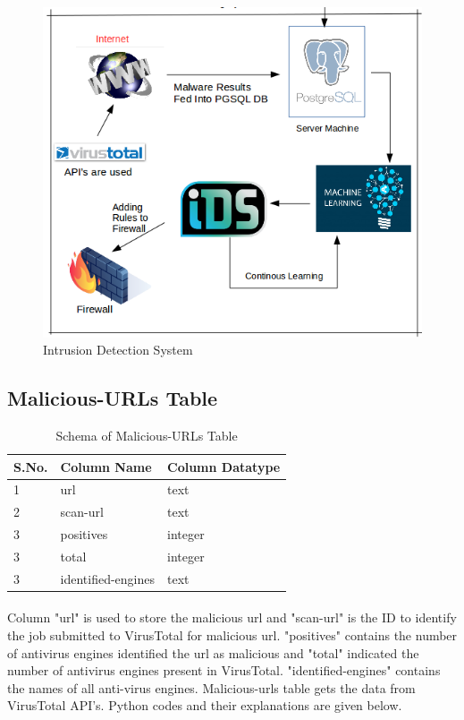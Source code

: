 \documentclass{report}
\begin{document}
\begin{figure}[H]
\centering
\caption{Intrusion Detection System}
\includegraphics[scale=0.7]{Intrusion_Detection_System}
\end{figure}

\subsection{Malicious-URLs Table}

\begin{table}[H]
\begin{tabular}{ |p{2cm}|p{5cm}|p{5cm}|  }
 \hline
 \textbf{S.No.} & \textbf{Column Name} & \textbf{Column Datatype}\\
 \hline
 \hline
 1 & url & text \\
 \hline
2 & scan-url & text \\
\hline
3 & positives & integer \\
\hline
3 & total & integer \\
\hline
3 & identified-engines & text \\
\hline
\end{tabular}
 \caption{Schema of Malicious-URLs Table}
\end{table}

\paragraph{}
Column "url" is used to store the malicious url and "scan-url" is the ID to identify the job submitted to VirusTotal for malicious url. "positives" contains the number of antivirus engines identified the url as malicious and   "total" indicated the number of antivirus engines present in VirusTotal. "identified-engines" contains the names of all anti-virus engines. Malicious-urls table gets the data from VirusTotal API's. Python codes and their explanations are given below.
\end{document}
